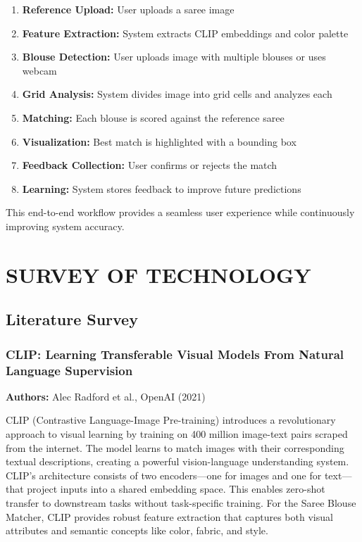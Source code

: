 \documentclass[12pt,a4paper]{report}
\begin{document}
\begin{enumerate}
    \item \textbf{Reference Upload:} User uploads a saree image
    \item \textbf{Feature Extraction:} System extracts CLIP embeddings and color palette
    \item \textbf{Blouse Detection:} User uploads image with multiple blouses or uses webcam
    \item \textbf{Grid Analysis:} System divides image into grid cells and analyzes each
    \item \textbf{Matching:} Each blouse is scored against the reference saree
    \item \textbf{Visualization:} Best match is highlighted with a bounding box
    \item \textbf{Feedback Collection:} User confirms or rejects the match
    \item \textbf{Learning:} System stores feedback to improve future predictions
\end{enumerate}

This end-to-end workflow provides a seamless user experience while continuously improving system accuracy.

\chapter{SURVEY OF TECHNOLOGY}

\section{Literature Survey}

\subsection{CLIP: Learning Transferable Visual Models From Natural Language Supervision}

\textbf{Authors:} Alec Radford et al., OpenAI (2021)

CLIP (Contrastive Language-Image Pre-training) introduces a revolutionary approach to visual learning by training on 400 million image-text pairs scraped from the internet. The model learns to match images with their corresponding textual descriptions, creating a powerful vision-language understanding system. CLIP's architecture consists of two encoders—one for images and one for text—that project inputs into a shared embedding space. This enables zero-shot transfer to downstream tasks without task-specific training. For the Saree Blouse Matcher, CLIP provides robust feature extraction that captures both visual attributes and semantic concepts like color, fabric, and style.
\end{document}
